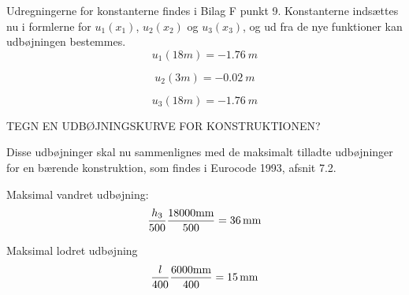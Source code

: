 Udregningerne for konstanterne findes i Bilag F punkt 9.
\newline
\newline 
Konstanterne indsættes nu i formlerne for $u_1(x_1)$, $u_2(x_2)$ og $u_3(x_3)$, og ud fra de nye funktioner kan udbøjningen bestemmes.
\begin{equation}
u_1(18m) = \SI{-1,76}{m}
\end{equation}

\begin{equation}
u_2(3m) = \SI{-0,02}{m}
\end{equation}

\begin{equation}
u_3(18m) = \SI{-1,76}{m}
\end{equation}

TEGN EN UDBØJNINGSKURVE FOR KONSTRUKTIONEN? 

Disse udbøjninger skal nu sammenlignes med de maksimalt tilladte udbøjninger for en bærende konstruktion, som findes i Eurocode 1993, afsnit 7.2. 

Maksimal vandret udbøjning: 
\begin{equation}
\frac{h_3}{500}
\\
\frac{18000 \text{mm}}{500} = \SI{36}{mm}
\end{equation}

Maksimal lodret udbøjning
\begin{equation}
\frac{l}{400}
\\
\frac{6000 \text{mm}}{400} = \SI{15}{mm}
\end{equation}
